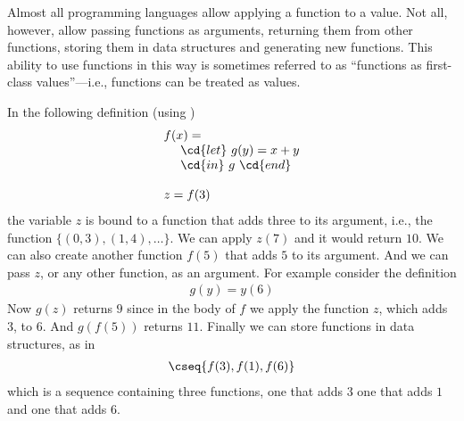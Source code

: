 \begin{flex}
\label{grp:grm:language::functional-algorithms::almost}

\begin{gram}
\label{grm:language::functional-algorithms::almost}
Almost all programming languages allow applying a function to a
value.  Not all, however, allow passing functions as arguments, returning
them from other functions, storing them in data structures and
generating new functions.
This ability to use functions in this way is sometimes referred to as
``functions as first-class values''---i.e., functions can be treated
as values.

\end{gram}

\begin{example}
\label{xmpl:language::functional-algorithms::examples-of-functions-as-values}
In the following definition (using \pml{})
\[
\begin{array}{l}
f(x) =
\\
~~~~\cd{let}~g(y) = x + y 
\\
~~~~\cd{in}~g~\cd{end}
\\
\\
z = f(3)
\end{array}
\]
the variable $z$ is bound to a function that adds three to its argument, i.e., the function $\{(0,3),(1,4),\ldots\}$.   We
can apply $z(7)$ and it would return $10$.   We can also create
another function $f(5)$ that adds $5$ to its argument.
And we can pass $z$, or any other function, as an argument.   For
example consider the definition
\[
\begin{array}{l}
g(y) = y(6) 
\end{array}
\]
Now $g(z)$ returns $9$ since in the body of $f$ we apply the
function $z$, which adds $3$, to $6$.   And $g(f(5))$ returns $11$.
Finally we can store functions in data structures, as in 
\[
\begin{array}{l}
\cseq{f(3), f(1), f(6)}
\end{array}
\]
which is a sequence containing three functions, one that adds $3$ one
that adds $1$ and one that adds $6$.

\end{example}
\end{flex}

